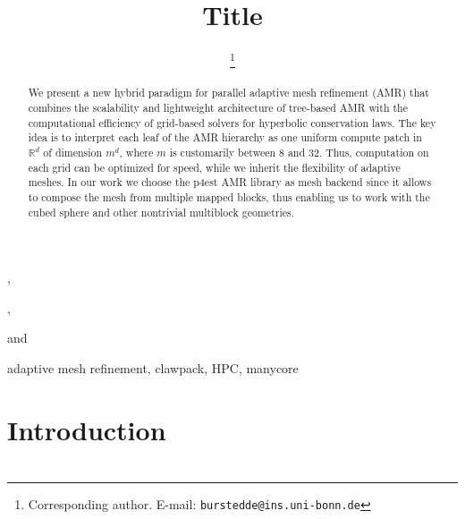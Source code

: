 \documentclass{IOS-Book-Article}     %
\newcommand{\sR}{\mathbb{R}}
\begin{document}
\begin{frontmatter}          %
%
\title{Title}

%
\author[A]{ %
\thanks{Corresponding author.  E-mail: \texttt{burstedde@ins.uni-bonn.de}}},
\author[B]{ },
\author[C]{ } and
\author[C]{ }
\address[A]{Institut f\"ur Numerische Simulation, Universit\"at Bonn, Germany}
\address[B]{Boise State University, Idaho, USA}
\address[C]{Institute for Computational Engineering and Sciences,\\
The University of Texas at Austin, USA}

\begin{abstract}
%
We present a new hybrid paradigm for parallel adaptive mesh refinement (AMR)
that combines the scalability and lightweight architecture of tree-based AMR
with the computational efficiency of grid-based solvers for hyperbolic
conservation laws.  The key idea is to interpret each leaf of the AMR hierarchy
as one uniform compute patch in $\sR^d$ of dimension $m^d$, where $m$ is
customarily between 8 and 32.  Thus, computation on each grid can be optimized
for speed, while we inherit the flexibility of adaptive meshes.  In our work we
choose the p4est AMR library as mesh backend since it allows to compose the
mesh from multiple mapped blocks, thus enabling us to work with the cubed
sphere and other nontrivial multiblock geometries.
%
\end{abstract}

\begin{keyword}
adaptive mesh refinement,
clawpack,
HPC,
manycore
\end{keyword}

\end{frontmatter}

\cite{BursteddeWilcoxGhattas11}


\section*{Introduction}

\section*{}

\section*{}



\end{document}
